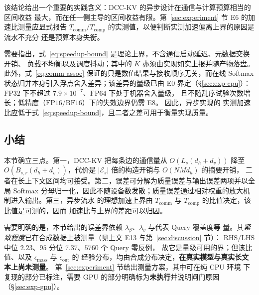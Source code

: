 该结论给出一个重要的实践含义：DCC-KV 的异步设计在通信与计算预算相当的区间收益
最大，而在任一侧主导的区间收益有限。第~\ref{sec:experiment} 节 E6 的加速比测量应显式报告
$T_{\text{comm}} / T_{\text{comp}}$ 的实测值，以便判断实测加速偏离上界的原因是流水不充分
还是预算本身失衡。

需要指出，式~\eqref{eq:speedup-bound} 是理论上界，不含通信启动延迟、元数据交换开销、
负载不均衡以及调度抖动；其中的 $K$ 亦须由实现如实上报并随产物落盘。此外，式~\eqref{eq:comm-assoc} 保证的只是数值结果与接收顺序无关，而在线 Softmax
状态归并本身引入浮点舍入差异；该差异的量级已由 E0 界定（\S\ref{sec:exp-cpu}）：
$\mathrm{FP32}$ 下不超过 $7.9\times10^{-7}$、$\mathrm{FP64}$ 下处于机器舍入量级，
且不随乱序试验次数增长；低精度（$\mathrm{FP16}$/$\mathrm{BF16}$）下的失效边界仍需 E8。
因此，异步实现的
实测加速比应低于式~\eqref{eq:speedup-bound}，且二者之差可用于衡量实现质量。

\subsection{小结}

本节确立三点。第一，DCC-KV 把每条边的通信量从 $O(L_s(d_h+d_v))$ 降至
$O(B_{s,r}(d_h+d_v))$，代价是 $|\mathcal{E}_s|$ 倍的构造开销与 $O(NM d_h)$ 的摘要开销，
二者在长上下文区间均可接受。第二，误差可分解为质量误差与输出误差两项并以全局 Softmax
分母归一化，因此不随设备数发散；质量误差通过相对权重的放大机制进入输出。第三，异步流水
的理想加速上界由 $T_{\text{comm}}$ 与 $T_{\text{comp}}$ 的比值决定，该比值是可测的，因而
加速比与上界的差距可以归因。

需要明确的是，本节给出的误差界依赖 $\lambda_\beta$、$\lambda_v$ 与代表 Query 覆盖度等
量。其\emph{紧致程度}已在合成数据上被测量（见上文 E13 与第~\ref{sec:discussion} 节）：
$\mathrm{RHS}/\mathrm{LHS}$ 中位 $2.23$、$95$ 分位 $7.37$、$5760$ 个 Query 零反例，
故它是量级可用的界；但该比值、以及 $\epsilon_{\text{mass}}$ 与 $\epsilon_{\text{out}}$ 的
经验分布，均由合成分布决定，\textbf{在真实模型与真实长文本上尚未测量}。
第~\ref{sec:experiment} 节给出测量方案，其中可在纯 CPU 环境
下复现的部分已标注，需要 GPU 的部分明确标为\textbf{未执行}并说明闸门原因（\S\ref{sec:exp-gpu}）。
